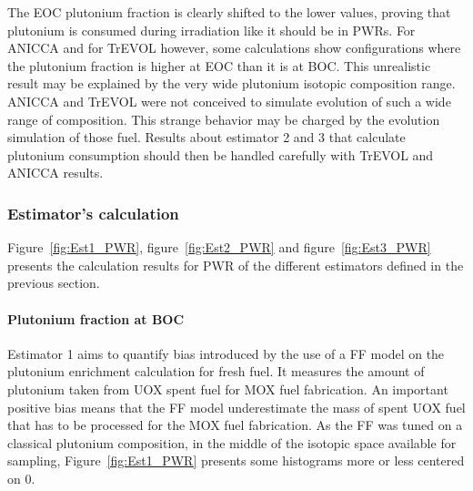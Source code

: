The EOC plutonium fraction is clearly shifted to the lower values, proving that plutonium is consumed during irradiation like it should be in PWRs. For ANICCA and for TrEVOL however, some calculations show configurations where the plutonium fraction is higher at EOC than it is at BOC. This unrealistic result may be explained by the very wide plutonium isotopic composition range. ANICCA and TrEVOL were not conceived to simulate evolution of such a wide range of composition. This strange behavior may be charged by the evolution simulation of those fuel. Results about estimator 2 and 3 that calculate plutonium consumption should then be handled carefully with TrEVOL and ANICCA results.   

\subsubsection{Estimator's calculation}

Figure~\ref{fig:Est1_PWR}, figure~\ref{fig:Est2_PWR} and figure~\ref{fig:Est3_PWR} presents the calculation results for PWR of the different estimators defined in the previous section. 

\paragraph{Plutonium fraction at BOC}
Estimator 1 aims to quantify bias introduced by the use of a FF model on the plutonium enrichment calculation for fresh fuel. It measures the amount of plutonium taken from UOX spent fuel for MOX fuel fabrication. An important positive bias means that the FF model underestimate the mass of spent UOX fuel that has to be processed for the MOX fuel fabrication. As the FF was tuned on a classical plutonium composition, in the middle of the isotopic space available for sampling, Figure~\ref{fig:Est1_PWR} presents some histograms more or less centered on 0.
        

